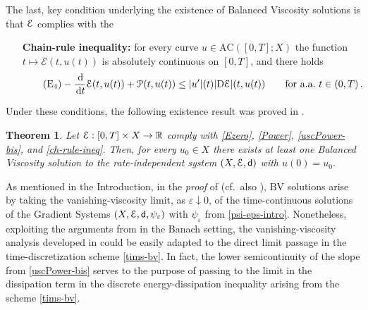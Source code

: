 \documentclass[a4paper,10pt,reqno]{amsart} %
\newcommand{\R}{\mathbb{R}}
\newtheorem{theorem}{Theorem}[section]
\numberwithin{equation}{section}
\newcommand{\down}{\downarrow}
\def\rmD{{\mathrm D}} \def\rmE{{\mathrm E}} \def\rmF{{\mathrm F}}
\def\dd{\;\!\mathrm{d}} %
\newcommand{\eps}{\varepsilon}
\newcommand{\foraa}{\text{for a.a.\ }}
\newcommand{\Xs}{X}
\newcommand{\AC}{\mathrm{AC}}
\newcommand{\BV}{\mathrm{BV}}
\newcommand{\mdn}{\mathsf{d}}
\newcommand{\ene}[2]{\mathcal{E}(#1,#2)}
\newcommand{\pw}[2]{\mathcal{P}(#1,#2)}
\newcommand{\RIS}{(\Xs,\calE,\mdn)}
\newcommand{\slope}[3]{|\rmD {#1}|(#2,#3)}
\newcommand{\RRR}{\color{red}}
\newcommand{\EEE}{\color{black}}
\begin{document}
The last, key condition  underlying the existence of Balanced Viscosity solutions is that ${\mathcal E}$ complies with the
\begin{itemize}
\item[\textbf{Chain-rule inequality:}] for every curve $u\in \AC([0,T];\Xs)$   the function $t\mapsto \ene t{u(t)}$ is absolutely continuous on $[0,T]$, and there holds
\begin{equation}
\label{ch-rule-ineq}
\tag{$\mathrm{E}_4$}
-\frac{\dd}{\dd t} \ene t{u(t)} +\pw t{u(t)} \leq |u'|(t) \slope \calE{t}{u(t)} \qquad \foraa t \in (0,T)\,.
\end{equation}
\end{itemize}
Under these conditions, the following existence result  was proved in \cite{MRS-MJM}.
\begin{theorem}
\label{th:ex-bv}
  Let $\calE: [0,T]\times \Xs \to \R$ comply with  \eqref{Ezero}, \eqref{Power}, \eqref{uscPower-bis}, and  \eqref{ch-rule-ineq}.
  Then, for every $u_0\in \Xs$ there exists at least one Balanced Viscosity solution to the rate-independent system $\RIS$ with $u(0)=u_0$.
\end{theorem}
As  mentioned in the Introduction, in the \emph{proof} of 
 \cite[Thm.\ 4.2]{MRS-MJM} (cf.\ also \cite{MRS09}), $\BV$ solutions arise 
 by taking  the vanishing-viscosity limit, as $\eps \down 0$,  of  the time-continuous solutions of the 
 Gradient Systems $(X,\calE,\mdn,\psi_\eps)$ with $\psi_\eps$ from \eqref{psi-eps-intro}.  %
 Nonetheless, exploiting the arguments from \cite{MRS12, MRS13} in the Banach setting,
  the  vanishing-viscosity analysis  developed in \cite{MRS-MJM}  could be easily adapted to the direct limit passage in the time-discretization scheme \eqref{tims-bv}.
  In fact, the lower semicontinuity of the slope from \eqref{uscPower-bis} serves
   to the purpose of passing to the limit in the dissipation term  %
   in the discrete energy-dissipation inequality arising from the scheme \eqref{tims-bv}.
\end{document}
